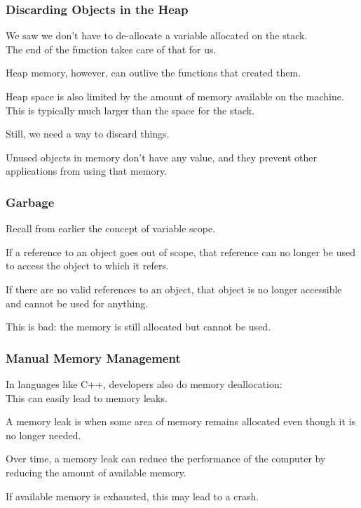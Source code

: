 \begin{frame}
\frametitle{Discarding Objects in the Heap}

We saw we don't have to de-allocate a variable allocated on the stack.\\
\quad The end of the function takes care of that for us.

Heap memory, however, can outlive the functions that created them.

Heap space is also limited by the amount of memory available on the machine. This is typically much larger than the space for the stack. 

Still, we need a way to discard things. 

Unused objects in memory don't have any value, and they prevent other applications from using that memory.

\end{frame}

\begin{frame}
\frametitle{Garbage}

Recall from earlier the concept of variable scope.

If a reference to an object goes out of scope, that reference can no longer be used to access the object to which it refers.

If there are no valid references to an object, that object is no longer accessible and cannot be used for anything.

This is bad: the memory is still allocated but cannot be used.
\end{frame}


\begin{frame}
\frametitle{Manual Memory Management}

In languages like C++, developers also do memory deallocation:\\
\quad This can easily lead to \alert{memory leaks}.

A memory leak is when some area of memory remains allocated even though it is no longer needed.

Over time, a memory leak can reduce the performance of the computer by reducing the amount of available memory. 

If available memory is exhausted, this may lead to a crash.

\end{frame}

